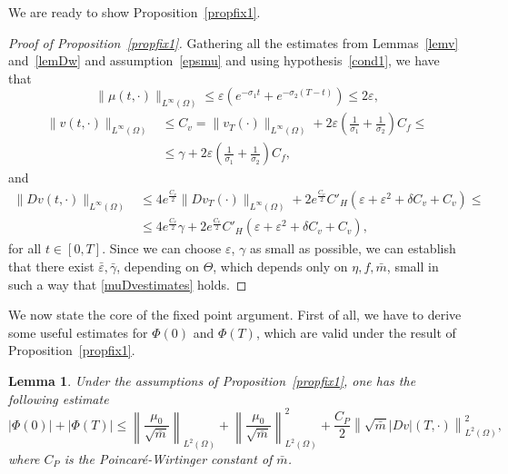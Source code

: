 \documentclass[10pt,a4paper,nouppercase,nowrite]{article}
\numberwithin{equation}{section}
\newcommand{\eps}{\varepsilon}
\newtheorem{lem}[defn]{Lemma}
\theoremstyle{definition}
\begin{document}
	We are ready to show Proposition~\ref{propfix1}.
	\begin{proof}[Proof of Proposition~\ref{propfix1}]
		Gathering all the estimates from Lemmas~\ref{lemv} and~\ref{lemDw} and assumption~\eqref{epsmu} and using hypothesis~\eqref{cond1}, we have that
		\begin{equation*}
			\| \mu(t,\cdot)\|_{L^{\infty}(\Omega)} \le \eps \left( e^{-\sigma_1 t} + e^{-\sigma_2(T-t)} \right) \le 2 \eps,
		\end{equation*}
		\begin{equation*}
			\begin{split}
			\|v(t,\cdot)\|_{L^{\infty}(\Omega)} &\le C_v = \| v_T(\cdot) \|_{L^{\infty}(\Omega)} + 2 \eps \left( \frac{1}{\sigma_1} + \frac{1}{\sigma_2} \right)C_f \le \\
			&\le \gamma +  2 \eps \left( \frac{1}{\sigma_1} + \frac{1}{\sigma_2} \right) C_f,
			\end{split}
		\end{equation*}
		and
		\begin{equation*}
			\begin{split}
			\|Dv(t,\cdot)\|_{L^{\infty}(\Omega)} &\le 4 e^{\frac{C_v}{2}} \| Dv_T(\cdot) \|_{L^{\infty}(\Omega)} + 2 e^{\frac{C_v}{2}} C'_H \left( \eps + \eps^2 + \delta C_v + C_v \right) \le \\ &\le 4 e^{\frac{C_v}{2}} \gamma + 2 e^{\frac{C_v}{2}} C'_H \left( \eps + \eps^2 + \delta C_v + C_v \right),
		\end{split}
		\end{equation*}
	for all $t \in [0,T]$.
	Since we can choose $\eps$, $\gamma$ as small as possible, we can establish that there exist $\bar \eps, \bar \gamma$, depending on $\Theta$, which depends only on $\eta,f,\bar m$, small in such a way that \eqref{muDvestimates} holds.
	\end{proof}
	We now state the core of the fixed point argument. First of all, we have to derive some useful estimates for $\Phi(0)$ and $\Phi(T)$, which are valid under the result of Proposition~\ref{propfix1}.
	\begin{lem}
		Under the assumptions of Proposition~\ref{propfix1}, one has the following estimate
		\begin{equation}
			|\Phi(0)| + |\Phi(T)| \le \left\| \frac{\mu_0}{\sqrt{\bar{m}}} \right\|_{L^{2}(\Omega)} + \left\| \frac{\mu_0}{\sqrt{\bar{m}}} \right\|^2_{L^{2}(\Omega)} + \frac{C_P}{2} \left\| \sqrt{\bar{m}} |Dv|(T,\cdot)\right\|^2_{L^2(\Omega)},
			\label{phi0T}
		\end{equation}
		where $C_P$ is the Poincar\'e-Wirtinger constant of $\bar m$.
		\label{lemphi}
	\end{lem}
\end{document}
